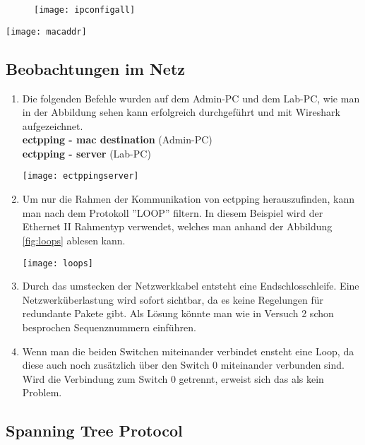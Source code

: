 \documentclass{scrartcl}
\begin{document}
	\begin{figure}[htbp]
	\centering
    \texttt{[image: ipconfigall]}
    \label{fig:ipconfigall}
	\end{figure}
	
    \texttt{[image: macaddr]}
    \label{fig:macaddr}
  
  \subsection[Aufgabe 4 Beobachtungen im Netz]{Beobachtungen im Netz}
  
  \renewcommand{\labelenumi}{\alph{enumi})}
  \begin{enumerate}
  \item
  Die folgenden Befehle wurden auf dem Admin-PC und dem Lab-PC, wie man in der Abbildung sehen kann erfolgreich durchgeführt und mit Wireshark aufgezeichnet.\\
  \textbf{ectpping - mac destination} (Admin-PC)\\
  \textbf{ectpping - server} (Lab-PC)
  
    \texttt{[image: ectppingserver]}
    \label{fig:ectppingserver}
  
  \item
  Um nur die Rahmen der Kommunikation von ectpping herauszufinden, kann man nach dem Protokoll ''LOOP'' filtern. In diesem Beispiel wird der Ethernet II Rahmentyp verwendet, welches man anhand der Abbildung \ref{fig:loops} ablesen kann.
  
    \texttt{[image: loops]}
    \label{fig:loops}
  \newline
  \item
  Durch das umstecken der Netzwerkkabel entsteht eine Endschlosschleife. Eine Netzwerküberlastung wird sofort sichtbar, da es keine Regelungen für redundante Pakete gibt. Als Lösung könnte man wie in Versuch 2 schon besprochen Sequenznummern einführen.
  
  \item
  
  Wenn man die beiden Switchen miteinander verbindet ensteht eine Loop, da diese auch noch zusätzlich über den Switch 0 miteinander verbunden sind. Wird die Verbindung zum Switch 0 getrennt, erweist sich das als kein Problem.
 
 \end{enumerate}
 
 \subsection[Aufgabe 5 Spanning Tree Protocol]{Spanning Tree Protocol}
 
\end{document}
